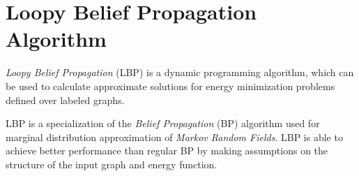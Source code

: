 \documentclass[notitlepage,english]{hgbreport}
\newcommand{\Acronym}[1]{{#1}}
\newcommand{\LBP}{\Acronym{LBP}}
\newcommand{\Vertices}{\mathcal{V}}
\newcommand{\Edges}{\mathcal{N}}
\newcommand{\Graph}{\mathcal{G}}
\begin{document}
\section{Loopy Belief Propagation Algorithm}\label{app:LBP}
\emph{Loopy Belief Propagation} (\LBP) \cite{Felzenszwalb2006} is a dynamic programming algorithm, which can be used to calculate approximate solutions for energy minimization problems defined over labeled graphs. 

\LBP{} is a specialization of the \emph{Belief Propagation} (\Acronym{BP}) algorithm used for {marginal distribution} approximation of \emph{Markov Random Fields}. \LBP{} is able to achieve better performance than regular \Acronym{BP} by making assumptions on the structure of the input graph and energy function.
\end{document}
